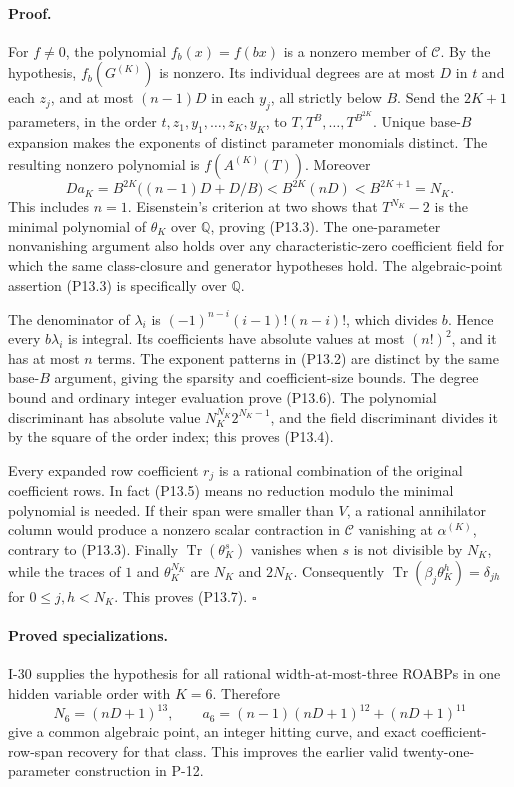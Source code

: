\paragraph{Proof.}
For $f\ne0$, the polynomial $f_b(x)=f(bx)$ is a nonzero member
of $\mathcal C$. By the hypothesis, $f_b(G^{(K)})$ is nonzero.
Its individual degrees are at most $D$ in $t$ and each $z_j$,
and at most $(n-1)D$ in each $y_j$, all strictly below $B$.
Send the $2K+1$ parameters, in the order
$t,z_1,y_1,\ldots,z_K,y_K$, to
$T,T^B,\ldots,T^{B^{2K}}$. Unique base-$B$ expansion makes
the exponents of distinct parameter monomials distinct.
The resulting nonzero polynomial is $f(A^{(K)}(T))$.
Moreover
\[
 Da_K=B^{2K}\bigl((n-1)D+D/B\bigr)
       <B^{2K}(nD)<B^{2K+1}=N_K.
\]
This includes $n=1$. Eisenstein's criterion at two shows that
$T^{N_K}-2$ is the minimal polynomial of $\theta_K$ over
$\mathbb Q$, proving (P13.3). The one-parameter nonvanishing
argument also holds over any characteristic-zero coefficient
field for which the same class-closure and generator hypotheses
hold. The algebraic-point assertion (P13.3) is specifically over
$\mathbb Q$.

The denominator of $\lambda_i$ is
$(-1)^{n-i}(i-1)!(n-i)!$, which divides $b$. Hence every
$b\lambda_i$ is integral. Its coefficients have absolute values
at most $(n!)^2$, and it has at most $n$ terms. The exponent
patterns in (P13.2) are distinct by the same base-$B$ argument,
giving the sparsity and coefficient-size bounds. The degree
bound and ordinary integer evaluation prove (P13.6). The
polynomial discriminant has absolute value
$N_K^{N_K}2^{N_K-1}$, and the field discriminant divides it by
the square of the order index; this proves (P13.4).

Every expanded row coefficient $r_j$ is a rational combination
of the original coefficient rows. In fact (P13.5) means no
reduction modulo the minimal polynomial is needed. If their
span were smaller than $V$, a rational annihilator column
would produce a nonzero scalar contraction in $\mathcal C$
vanishing at $\alpha^{(K)}$, contrary to (P13.3).
Finally $\operatorname{Tr}(\theta_K^s)$ vanishes when $s$ is not
divisible by $N_K$, while the traces of $1$ and $\theta_K^{N_K}$
are $N_K$ and $2N_K$. Consequently
$\operatorname{Tr}(\beta_j\theta_K^h)=\delta_{jh}$ for
$0\leq j,h<N_K$. This proves (P13.7). $\square$

\paragraph{Proved specializations.}
I-30 supplies the hypothesis for all rational width-at-most-three
ROABPs in one hidden variable order with $K=6$. Therefore
\[
 N_6=(nD+1)^{13},\qquad
 a_6=(n-1)(nD+1)^{12}+(nD+1)^{11}
\]
give a common algebraic point, an integer hitting curve, and exact
coefficient-row-span recovery for that class. This improves the
earlier valid twenty-one-parameter construction in P-12.

